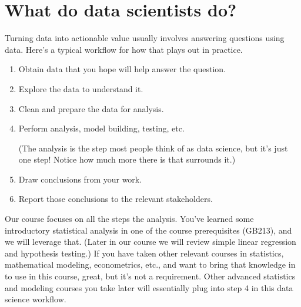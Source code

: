\documentclass[letterpaper,10pt,english]{sphinxmanual}
\begin{document}
\section{What do data scientists do?}
\label{\detokenize{chapter-1-intro-to-data-science:what-do-data-scientists-do}}
Turning data into actionable value usually involves answering questions using data.  Here’s a typical workflow for how that plays out in practice.
\begin{enumerate}
%
\item {} 
Obtain data that you hope will help answer the question.

\item {} 
Explore the data to understand it.

\item {} 
Clean and prepare the data for analysis.

\item {} 
Perform analysis, model building, testing, etc.

(The analysis is the step most people think of as data science, but it’s just one step!  Notice how much more there is that surrounds it.)

\item {} 
Draw conclusions from your work.

\item {} 
Report those conclusions to the relevant stakeholders.

\end{enumerate}

Our course focuses on all the steps  the analysis.  You’ve learned some introductory statistical analysis in one of the course prerequisites (GB213), and we will leverage that.  (Later in our course we will review simple linear regression and hypothesis testing.)  If you have taken other relevant courses in statistics, mathematical modeling, econometrics, etc., and want to bring that knowledge in to use in this course, great, but it’s not a requirement.  Other advanced statistics and modeling courses you take later will essentially plug into step 4 in this data science workflow.
\end{document}
